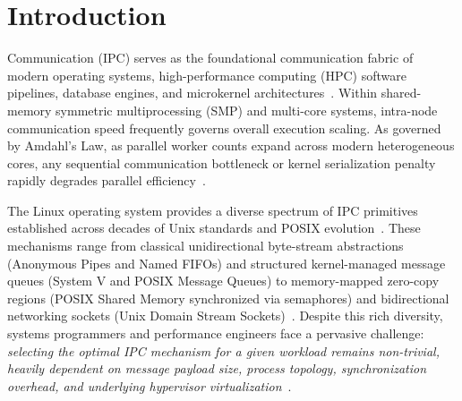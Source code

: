 \section{Introduction}
\label{sec:introduction}

 Communication (IPC) serves as the foundational communication fabric of modern operating systems, high-performance computing (HPC) software pipelines, database engines, and microkernel architectures~\cite{silberschatz2018operating,kerrisk2010linux}. Within shared-memory symmetric multiprocessing (SMP) and multi-core systems, intra-node communication speed frequently governs overall execution scaling. As governed by Amdahl's Law, as parallel worker counts expand across modern heterogeneous cores, any sequential communication bottleneck or kernel serialization penalty rapidly degrades parallel efficiency~\cite{herlihy2020art}.

The Linux operating system provides a diverse spectrum of IPC primitives established across decades of Unix standards and POSIX evolution~\cite{posix2018standard,stevens1999unixipc}. These mechanisms range from classical unidirectional byte-stream abstractions (Anonymous Pipes and Named FIFOs) and structured kernel-managed message queues (System V and POSIX Message Queues) to memory-mapped zero-copy regions (POSIX Shared Memory synchronized via semaphores) and bidirectional networking sockets (Unix Domain Stream Sockets)~\cite{kerrisk2010linux,stevens2004unix}. Despite this rich diversity, systems programmers and performance engineers face a pervasive challenge: \textit{selecting the optimal IPC mechanism for a given workload remains non-trivial, heavily dependent on message payload size, process topology, synchronization overhead, and underlying hypervisor virtualization}~\cite{danyliuk2026classical,renault2018efficient}.

